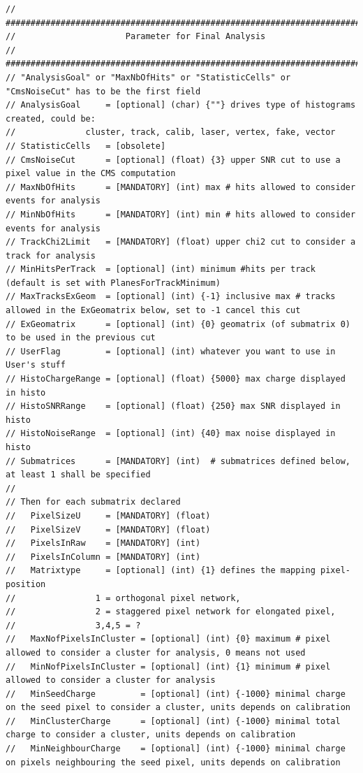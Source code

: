 \documentclass[a4paper, 12pt, twoside]{article}
\begin{document}
\begin{verbatim}
// #############################################################################
//                      Parameter for Final Analysis 
// #############################################################################
// "AnalysisGoal" or "MaxNbOfHits" or "StatisticCells" or "CmsNoiseCut" has to be the first field
// AnalysisGoal     = [optional] (char) {""} drives type of histograms created, could be:
//              cluster, track, calib, laser, vertex, fake, vector
// StatisticCells   = [obsolete]
// CmsNoiseCut      = [optional] (float) {3} upper SNR cut to use a pixel value in the CMS computation
// MaxNbOfHits      = [MANDATORY] (int) max # hits allowed to consider events for analysis
// MinNbOfHits      = [MANDATORY] (int) min # hits allowed to consider events for analysis
// TrackChi2Limit   = [MANDATORY] (float) upper chi2 cut to consider a track for analysis
// MinHitsPerTrack  = [optional] (int) minimum #hits per track (default is set with PlanesForTrackMinimum)
// MaxTracksExGeom  = [optional] (int) {-1} inclusive max # tracks allowed in the ExGeomatrix below, set to -1 cancel this cut
// ExGeomatrix      = [optional] (int) {0} geomatrix (of submatrix 0) to be used in the previous cut
// UserFlag         = [optional] (int) whatever you want to use in User's stuff
// HistoChargeRange = [optional] (float) {5000} max charge displayed in histo
// HistoSNRRange    = [optional] (float) {250} max SNR displayed in histo
// HistoNoiseRange  = [optional] (int) {40} max noise displayed in histo
// Submatrices      = [MANDATORY] (int)  # submatrices defined below, at least 1 shall be specified
//
// Then for each submatrix declared 
//   PixelSizeU     = [MANDATORY] (float)
//   PixelSizeV     = [MANDATORY] (float)
//   PixelsInRaw    = [MANDATORY] (int)
//   PixelsInColumn = [MANDATORY] (int)
//   Matrixtype     = [optional] (int) {1} defines the mapping pixel-position
//                1 = orthogonal pixel network,
//                2 = staggered pixel network for elongated pixel,
//                3,4,5 = ?
//   MaxNofPixelsInCluster = [optional] (int) {0} maximum # pixel allowed to consider a cluster for analysis, 0 means not used
//   MinNofPixelsInCluster = [optional] (int) {1} minimum # pixel allowed to consider a cluster for analysis
//   MinSeedCharge         = [optional] (int) {-1000} minimal charge on the seed pixel to consider a cluster, units depends on calibration
//   MinClusterCharge      = [optional] (int) {-1000} minimal total charge to consider a cluster, units depends on calibration
//   MinNeighbourCharge    = [optional] (int) {-1000} minimal charge on pixels neighbouring the seed pixel, units depends on calibration

\end{verbatim}
\end{document}
